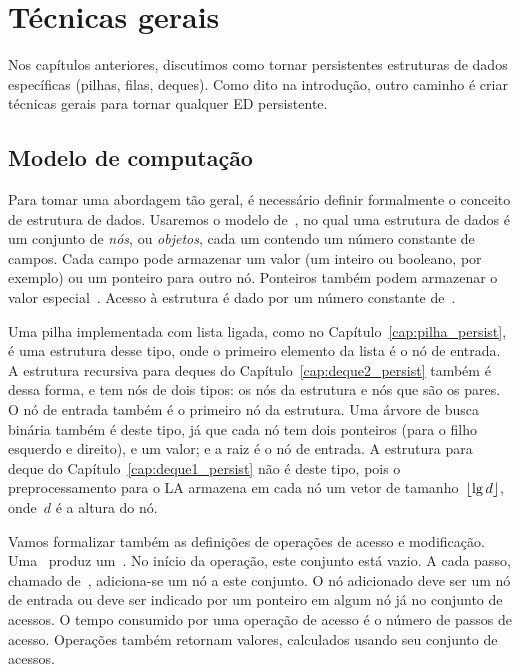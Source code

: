 \documentclass[main.tex]{subfiles}
\begin{document}
\chapter{Técnicas gerais} \label{cap:geral_persist}

Nos capítulos anteriores, discutimos como tornar persistentes estruturas de dados específicas (pilhas, filas, deques). Como dito na introdução, outro caminho é criar técnicas gerais para tornar qualquer ED persistente.


\section{Modelo de computação}

Para tomar uma abordagem tão geral, é necessário definir formalmente o conceito de estrutura de dados.  Usaremos o modelo de~, no qual uma estrutura de dados é um conjunto de \emph{nós}, ou \emph{objetos}, cada um contendo um número constante de campos. Cada campo pode armazenar um valor (um inteiro ou booleano, por exemplo) ou um ponteiro para outro nó. Ponteiros também podem armazenar o valor especial~.  Acesso à estrutura é dado por um número constante de~.


Uma pilha implementada com lista ligada, como no Capítulo~\ref{cap:pilha_persist}, é uma estrutura desse tipo, onde o primeiro elemento da lista é o nó de entrada. A estrutura recursiva para deques do Capítulo~\ref{cap:deque2_persist} também é dessa forma, e tem nós de dois tipos: os nós da estrutura e nós que são os pares. O nó de entrada também é o primeiro nó da estrutura.  Uma árvore de busca binária também é deste tipo, já que cada nó tem dois ponteiros (para o filho esquerdo e direito), e um valor; e a raiz é o nó de entrada.  A estrutura para deque do Capítulo~\ref{cap:deque1_persist} não é deste tipo, pois o preprocessamento para o LA armazena em cada nó um vetor de tamanho~$\lfloor\lg d\rfloor$, onde~$d$ é a altura do nó.

Vamos formalizar também as definições de operações de acesso e modificação. Uma~ produz um~. No início da operação, este conjunto está vazio.  A cada passo, chamado de~, adiciona-se um nó a este conjunto. O nó adicionado deve ser um nó de entrada ou deve ser indicado por um ponteiro em algum nó já no conjunto de acessos. O tempo consumido por uma operação de acesso é o número de passos de acesso. Operações também retornam valores, calculados usando seu conjunto de acessos.
\end{document}
